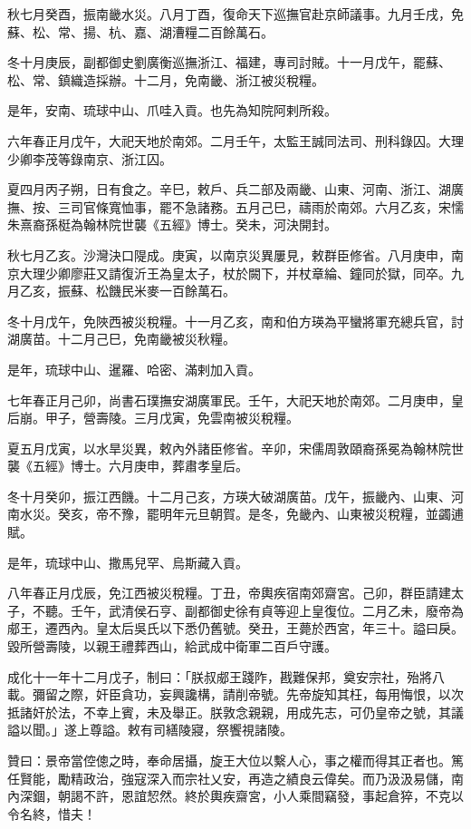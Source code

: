 \begin{pinyinscope}
秋七月癸酉，振南畿水災。八月丁酉，復命天下巡撫官赴京師議事。九月壬戌，免蘇、松、常、揚、杭、嘉、湖漕糧二百餘萬石。

冬十月庚辰，副都御史劉廣衡巡撫浙江、福建，專司討賊。十一月戊午，罷蘇、松、常、鎮織造採辦。十二月，免南畿、浙江被災稅糧。

是年，安南、琉球中山、爪哇入貢。也先為知院阿剌所殺。

六年春正月戊午，大祀天地於南郊。二月壬午，太監王誠同法司、刑科錄囚。大理少卿李茂等錄南京、浙江囚。

夏四月丙子朔，日有食之。辛巳，敕戶、兵二部及兩畿、山東、河南、浙江、湖廣撫、按、三司官條寬恤事，罷不急諸務。五月己巳，禱雨於南郊。六月乙亥，宋懦朱熹裔孫梃為翰林院世襲《五經》博士。癸未，河決開封。

秋七月乙亥。沙灣決口隄成。庚寅，以南京災異屢見，敕群臣修省。八月庚申，南京大理少卿廖莊又請復沂王為皇太子，杖於闕下，并杖章綸、鐘同於獄，同卒。九月乙亥，振蘇、松饑民米麥一百餘萬石。

冬十月戊午，免陜西被災稅糧。十一月乙亥，南和伯方瑛為平蠻將軍充總兵官，討湖廣苗。十二月己巳，免南畿被災秋糧。

是年，琉球中山、暹羅、哈密、滿剌加入貢。

七年春正月己卯，尚書石璞撫安湖廣軍民。壬午，大祀天地於南郊。二月庚申，皇后崩。甲子，營壽陵。三月戊寅，免雲南被災稅糧。

夏五月戊寅，以水旱災異，敕內外諸臣修省。辛卯，宋儒周敦頤裔孫冕為翰林院世襲《五經》博士。六月庚申，葬肅孝皇后。

冬十月癸卯，振江西饑。十二月己亥，方瑛大破湖廣苗。戊午，振畿內、山東、河南水災。癸亥，帝不豫，罷明年元旦朝賀。是冬，免畿內、山東被災稅糧，並蠲逋賦。

是年，琉球中山、撒馬兒罕、烏斯藏入貢。

八年春正月戊辰，免江西被災稅糧。丁丑，帝輿疾宿南郊齋宮。己卯，群臣請建太子，不聽。壬午，武清侯石亨、副都御史徐有貞等迎上皇復位。二月乙未，廢帝為郕王，遷西內。皇太后吳氏以下悉仍舊號。癸丑，王薨於西宮，年三十。謚曰戾。毀所營壽陵，以親王禮葬西山，給武成中衛軍二百戶守護。

成化十一年十二月戊子，制曰：「朕叔郕王踐阼，戡難保邦，奠安宗社，殆將八載。彌留之際，奸臣貪功，妄興讒構，請削帝號。先帝旋知其枉，每用悔恨，以次抵諸奸於法，不幸上賓，未及舉正。朕敦念親親，用成先志，可仍皇帝之號，其議謚以聞。」遂上尊謚。敕有司繕陵寢，祭饗視諸陵。

贊曰：景帝當倥傯之時，奉命居攝，旋王大位以繫人心，事之權而得其正者也。篤任賢能，勵精政治，強寇深入而宗社乂安，再造之績良云偉矣。而乃汲汲易儲，南內深錮，朝謁不許，恩誼恝然。終於輿疾齋宮，小人乘間竊發，事起倉猝，不克以令名終，惜夫！


\end{pinyinscope}